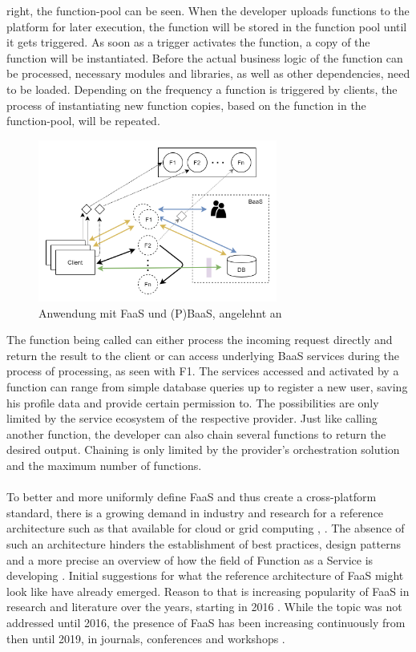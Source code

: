 \documentclass[a4paper,twoside,11pt, pagesize]{scrartcl}
\begin{document}
right, the function-pool can be seen. When the developer uploads functions to the platform for later execution, the function will be stored in the function pool until it gets triggered. As soon as a trigger activates the function, a copy of the function will be instantiated. Before the actual business logic of the function can be processed, necessary modules and libraries, as well as other dependencies, need to be loaded. Depending on the frequency a function is triggered by clients, the process of instantiating new function copies, based on the function in the function-pool, will be repeated.    
\begin{figure}[H]
\caption{Anwendung mit FaaS und (P)BaaS, angelehnt an \cite{shafiei2020serverless}}
\label{fig:FaaSBaaSExample}
\centering
\includegraphics[width=0.7\textwidth]{FaaS}
\end{figure}
The function being called can either process the incoming request directly and return the result to the client or can access underlying BaaS services during the process of processing, as seen with F1. The services accessed and activated by a function can range from simple database queries up to register a new user, saving his profile data and provide certain permission to. The possibilities are only limited by the service ecosystem of the respective provider. Just like calling another function, the developer can also chain several functions to return the desired output. Chaining is only limited by the provider's orchestration solution and the maximum number of functions.\\\\ To better and more uniformly define FaaS and thus create a cross-platform standard, there is a growing demand in industry and research for a reference architecture such as that available for cloud or grid computing \cite{liu2011nist}, \cite{foster2003grid}. The absence of such an architecture hinders the establishment of best practices, design patterns and a more precise an overview of how the field of Function as a Service is developing \cite{leitner2019mixed}. Initial suggestions for what the reference architecture of FaaS might look like have already emerged. Reason to that is increasing popularity of FaaS in research and literature over the years, starting in 2016  \cite{van2019spec}. While the topic was not addressed until 2016, the presence of FaaS has been increasing continuously from then until 2019, in journals, conferences and workshops \cite{Yussupov2019_SystematicMappingStudyFaaS}.
\end{document}

